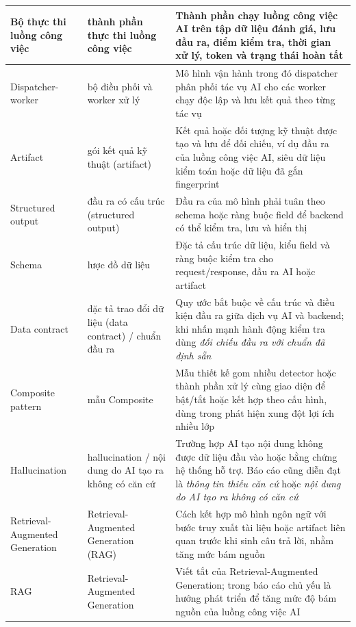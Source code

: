 \begin{longtable}{|C{0.16\textwidth}|P{0.22\textwidth}|P{0.55\textwidth}|}
  Bộ thực thi luồng công việc     &     thành phần thực thi luồng công việc     &     Thành phần chạy luồng công việc AI trên tập dữ liệu đánh giá, lưu đầu ra, điểm kiểm tra, thời gian xử lý, token và trạng thái hoàn tất \\ \hline
  Dispatcher-\allowbreak worker     &     bộ điều phối và worker xử lý     &     Mô hình vận hành trong đó dispatcher phân phối tác vụ AI cho các worker chạy độc lập và lưu kết quả theo từng tác vụ \\ \hline
  Artifact      &      gói kết quả kỹ thuật (artifact)      &      Kết quả hoặc đối tượng kỹ thuật được tạo và lưu để đối chiếu, ví dụ đầu ra của luồng công việc AI, siêu dữ liệu kiểm toán hoặc dữ liệu đã gắn fingerprint \\ \hline
  Structured output     &     đầu ra có cấu trúc (structured output)     &     Đầu ra của mô hình phải tuân theo schema hoặc ràng buộc field để backend có thể kiểm tra, lưu và hiển thị \\ \hline
  Schema      &      lược đồ dữ liệu      &      Đặc tả cấu trúc dữ liệu, kiểu field và ràng buộc kiểm tra cho request/response, đầu ra AI hoặc artifact \\ \hline
  Data contract      &      đặc tả trao đổi dữ liệu (data contract) / chuẩn đầu ra      &      Quy ước bắt buộc về cấu trúc và điều kiện đầu ra giữa dịch vụ AI và backend; khi nhấn mạnh hành động kiểm tra dùng \textit{đối chiếu đầu ra với chuẩn đã định sẵn} \\ \hline
  Composite pattern      &      mẫu Composite      &      Mẫu thiết kế gom nhiều detector hoặc thành phần xử lý cùng giao diện để bật/tắt hoặc kết hợp theo cấu hình, dùng trong phát hiện xung đột lợi ích nhiều lớp \\ \hline
  Hallucination     &     hallucination / nội dung do AI tạo ra không có căn cứ     &     Trường hợp AI tạo nội dung không được dữ liệu đầu vào hoặc bằng chứng hệ thống hỗ trợ. Báo cáo cũng diễn đạt là \textit{thông tin thiếu căn cứ} hoặc \textit{nội dung do AI tạo ra không có căn cứ} \\ \hline
  Retrieval-\allowbreak Augmented Generation     &     Retrieval-\allowbreak Augmented Generation (RAG)     &     Cách kết hợp mô hình ngôn ngữ với bước truy xuất tài liệu hoặc artifact liên quan trước khi sinh câu trả lời, nhằm tăng mức bám nguồn \\ \hline
  RAG      &      Retrieval-\allowbreak Augmented Generation      &      Viết tắt của Retrieval-Augmented Generation; trong báo cáo chủ yếu là hướng phát triển để tăng mức độ bám nguồn của luồng công việc AI \\ \hline

\end{longtable}
